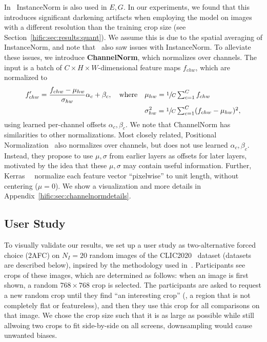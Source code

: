 In~\cite{wang2018highres} InstanceNorm is also used in $E, G$. In our experiments, we found that this introduces significant darkening artifacts when employing the model on images with a different resolution than the training crop size (see Section~\ref{hific:sec:results:quant}).
We assume this is due to the spatial averaging of InstanceNorm, and note that~\cite{park2019semantic} also saw issues with InstanceNorm. To alleviate these issues, we introduce \textbf{ChannelNorm}, which normalizes over channels. 
The input is a batch of $C{\times}H{\times}W$-dimensional feature maps $f_{chw}$, which are normalized to 
\begin{align}
    f'_{chw} = \frac{f_{chw}-\mu_{hw}}{\sigma_{hw}}
                \alpha_c + \beta_c, \quad \text{where} \quad
        &\mu_{hw} = \sfrac{1}{C} \textstyle \sum_{c=1}^C f_{chw} \\ \nonumber
        &\sigma_{hw}^2 = \sfrac{1}{C} \textstyle \sum_{c=1}^C (f_{chw} - \mu_{hw})^2,
\end{align}
using learned per-channel offsets $\alpha_c, \beta_c$.
We note that ChannelNorm has similarities to other normalizations. 
Most closely related, Positional Normalization~\cite{li2019positionalnorm} also normalizes over channels, but does not use learned $\alpha_c, \beta_c$. Instead, they propose to use $\mu, \sigma$ from earlier layers as offsets for later layers, motivated by the idea that these $\mu, \sigma$ may contain useful information.
Further, Kerras~\etal~\cite{karras2017progressive} normalize each feature vector ``pixelwise'' to unit length, without centering ($\mu=0$).
We show a visualization and more details in Appendix~\ref{hific:sec:channelnormdetails}.


\subsection{User Study} \label{hific:sec:userstudy}

To visually validate our results, we set up a user study as two-alternative forced choice (2AFC) on $N_I{=}20$ random images of the CLIC2020~\cite{clic2020} dataset (datasets are described below), inpsired by the methodology used in~\cite{clic2020}.
Participants see crops of these images, which are determined as follows: when an image is first shown, a random $768{\times}768$ crop is selected. The participants are asked to request a new random crop until they find ``an interesting crop'' (\ie, a region that is not completely flat or featureless), and then they use this crop for all comparisons on that image. We chose the crop size such that it is as large as possible while still allwoing two crops to fit side-by-side on all screens, downsampling would cause unwanted biases. %

